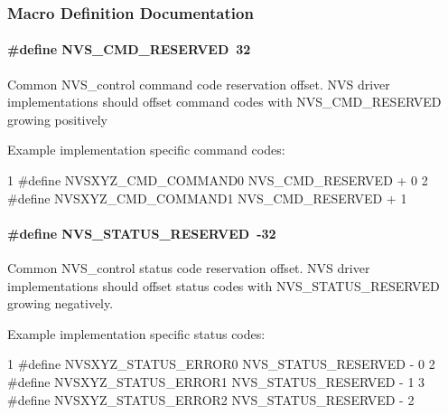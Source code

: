 \subsubsection{Macro Definition Documentation}
\paragraph[{N\+V\+S\+\_\+\+C\+M\+D\+\_\+\+R\+E\+S\+E\+R\+V\+E\+D}]{\setlength{\rightskip}{0pt plus 5cm}\#define N\+V\+S\+\_\+\+C\+M\+D\+\_\+\+R\+E\+S\+E\+R\+V\+E\+D~32}\label{group___n_v_s___c_o_n_t_r_o_l_gaa9fa1c41660d17139bce63ff34cd774f}
Common N\+V\+S\+\_\+control command code reservation offset. N\+V\+S driver implementations should offset command codes with N\+V\+S\+\_\+\+C\+M\+D\+\_\+\+R\+E\+S\+E\+R\+V\+E\+D growing positively

Example implementation specific command codes\+: 
\begin{DoxyCode}
1 #define NVSXYZ\_CMD\_COMMAND0     NVS\_CMD\_RESERVED + 0
2 #define NVSXYZ\_CMD\_COMMAND1     NVS\_CMD\_RESERVED + 1
\end{DoxyCode}
\paragraph[{N\+V\+S\+\_\+\+S\+T\+A\+T\+U\+S\+\_\+\+R\+E\+S\+E\+R\+V\+E\+D}]{\setlength{\rightskip}{0pt plus 5cm}\#define N\+V\+S\+\_\+\+S\+T\+A\+T\+U\+S\+\_\+\+R\+E\+S\+E\+R\+V\+E\+D~-\/32}\label{group___n_v_s___c_o_n_t_r_o_l_gad82fd139152ca14946c80c6c91edb4a0}
Common N\+V\+S\+\_\+control status code reservation offset. N\+V\+S driver implementations should offset status codes with N\+V\+S\+\_\+\+S\+T\+A\+T\+U\+S\+\_\+\+R\+E\+S\+E\+R\+V\+E\+D growing negatively.

Example implementation specific status codes\+: 
\begin{DoxyCode}
1 #define NVSXYZ\_STATUS\_ERROR0    NVS\_STATUS\_RESERVED - 0
2 #define NVSXYZ\_STATUS\_ERROR1    NVS\_STATUS\_RESERVED - 1
3 #define NVSXYZ\_STATUS\_ERROR2    NVS\_STATUS\_RESERVED - 2
\end{DoxyCode}
 